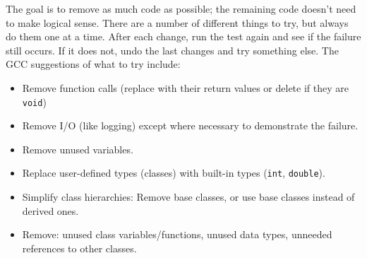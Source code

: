 The goal is to remove as much code as possible; the remaining code doesn't need to make logical sense. There are a number of different things to try, but always do them one at a time. After each change, run the test again and see if the failure still occurs. If it does not, undo the last changes and try something else. The GCC suggestions of what to try include:

\begin{itemize}
	\item Remove function calls (replace with their return values or delete if they are \texttt{void})
	\item Remove I/O (like logging) except where necessary to demonstrate the failure.
	\item Remove unused variables.
	\item Replace user-defined types (classes) with built-in types (\texttt{int}, \texttt{double}).
	\item Simplify class hierarchies: Remove base classes, or use base classes instead of derived ones.
	\item Remove: unused class variables/functions, unused data types, unneeded references to other classes.
\end{itemize}




